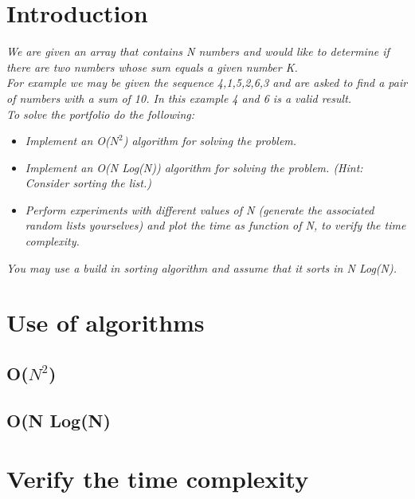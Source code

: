 \section{Introduction}
\emph{We are given an array that contains N numbers and would like to determine if there are two numbers whose sum equals a given number K.\\
For example we may be given the sequence 4,1,5,2,6,3 and are asked to find a pair of numbers with a sum of 10. In this example 4 and 6 is a valid result.\\
To solve the portfolio do the following:}
\begin{itemize}
\item \emph{Implement an O(\(N^{2}\)) algorithm for solving the problem.}
\item \emph{Implement an O(N Log(N)) algorithm for solving the problem. (Hint: Consider sorting the list.)}
\item \emph{Perform experiments with different values of N (generate the associated random lists yourselves)
and plot the time as function of N, to verify the time complexity.}
\end{itemize}
\emph{You may use a build in sorting algorithm and assume that it sorts in N Log(N).}

\section{Use of algorithms}
\subsection{O(\(N^{2}\))}
\subsection{O(N Log(N)}


\section{Verify the time complexity}
